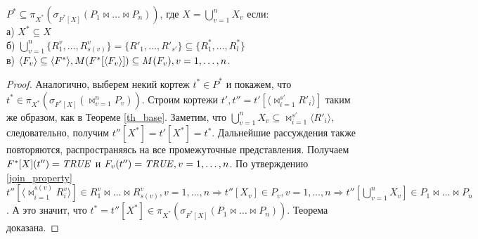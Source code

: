 \author{Мосин Сергей, Зыкин Сергей}
\def \bigcupn {\bigcup\limits_{v=1}^{n}}
\begin{theorem}
$P^{\ast} \subseteq \pi_{X^{\ast}} ( \sigma_{F^{\ast}[X]} (P_1 \bowtie \dots \bowtie P_n))$, где $X = \bigcupn X_{v}$ если:
\\а) $X^{\ast} \subseteq X$
\\б)
$ \bigcupn \{R^{v}_{1}, \ldots, R^{v}_{s(v)}\} = \{R'_{1}, \ldots, R'_{s'}\}
\subseteq
\{R^{\ast}_{1}, \ldots, R^{\ast}_{l}\} $
\\в) $\<F_v> \subseteq \<F^{\ast}> , M (F^{\ast}[\<F_v> ]) \subseteq M (F_{v}), v = 1,\dots,n $.

\label{th_mult}
\end{theorem}
\begin{proof}
Аналогично, выберем некий кортеж $t^{\ast} \in P^{\ast}$ и покажем, 
что $t^{\ast} \in \pi_{X^{\ast}} ( \sigma_{F^{\ast}[X]} (\bowtie_{v=1}^{n} P_{v}))$. Строим кортежи
$t', t'' = t'[\langle {\bowtie}_{i=1}^{s'} R'_i \rangle]$ таким же образом,
как в Теореме \ref{th_base}. Заметим, что $\bigcupn X_{v} \subseteq 
{\bowtie}_{i=1}^{s'} \langle R'_i \rangle$, следовательно, получим
$t''[X^{\ast}] = t'[X^{\ast}] = t^{\ast}$.
Дальнейшие рассуждения также повторяются, распространяясь на все промежуточные представления. Получаем $F^{\ast} [X] (t'') = \mathit{TRUE}$ и $F_v (t'') = \mathit{TRUE}, v = 1,\dots,n $.
По утверждению \ref{join_property} $t''[\langle \bowtie_{i=1}^{s(v)} R^v_i \rangle]
\in 
R^v_1 \bowtie \dots \bowtie R^v_{s(v)}, v = 1, \dots, n
\Rightarrow   
t''[X_v] \in P_v, v = 1, \dots, n
\Rightarrow
t''[\bigcupn X_{v}] \in P_1 \bowtie \dots \bowtie P_n$.
А это значит, что $t^{\ast} = t''[X^{\ast}] \in 
\pi_{X^{\ast}} ( \sigma_{F^{\ast}[X]} (P_1 \bowtie \dots \bowtie P_n))$.
Теорема доказана.
\end{proof}
